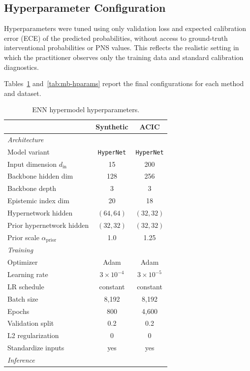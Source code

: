 \documentclass[accepted]{uai2026} %
\theoremstyle{plain}
\theoremstyle{definition}
\theoremstyle{remark}
\begin{document}
\subsection{Hyperparameter Configuration}
\label{app:hyperparams}

Hyperparameters were tuned using only
validation loss and expected calibration error
(ECE) of the predicted probabilities, without
access to ground-truth interventional
probabilities or PNS values.  This reflects the
realistic setting in which the practitioner
observes only the training data and standard
calibration diagnostics.

Tables~\ref{tab:enn-hparams}
and~\ref{tab:mb-hparams} report the final
configurations for each method and dataset.

\begin{table}[h]
\centering
\caption{ENN hypermodel hyperparameters.}
\label{tab:enn-hparams}
\small
\begin{tabular}{lcc}
\toprule
 & \textbf{Synthetic} & \textbf{ACIC} \\
\midrule
\multicolumn{3}{l}{\textit{Architecture}} \\
Model variant
  & \texttt{HyperNet}
  & \texttt{HyperNet} \\
Input dimension $d_{\mathrm{in}}$
  & 15 & 200 \\
Backbone hidden dim
  & 128 & 256 \\
Backbone depth
  & 3 & 3 \\
Epistemic index dim
  & 20 & 18 \\
Hypernetwork hidden
  & $(64, 64)$
  & $(32, 32)$ \\
Prior hypernetwork hidden
  & $(32, 32)$
  & $(32, 32)$ \\
Prior scale $\alpha_{\mathrm{prior}}$
  & 1.0 & 1.25 \\
\midrule
\multicolumn{3}{l}{\textit{Training}} \\
Optimizer
  & Adam & Adam \\
Learning rate
  & $3 \times 10^{-4}$
  & $3 \times 10^{-5}$ \\
LR schedule
  & constant & constant \\
Batch size
  & 8{,}192
  & 8{,}192 \\
Epochs
  & 800 & 4{,}600 \\
Validation split
  & 0.2 & 0.2 \\
L2 regularization
  & 0 & 0 \\
Standardize inputs
  & yes & yes \\
\midrule
\multicolumn{3}{l}{\textit{Inference}} \\

\end{tabular}
\end{table}
\end{document}
